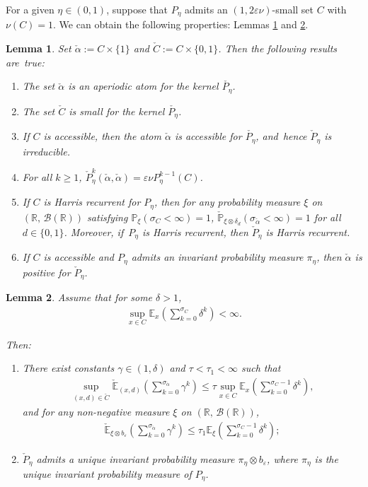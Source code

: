 \documentclass[11pt]{elsarticle}
\newtheorem{lemma}{Lemma}[section]
\def\geq{\geqslant}
\def\leq{\leqslant}
\def\P{\mathbb{P}}
\def\E{\mathbb{E}}
\def\R{\mathbb{R}}
\begin{document}
For a given $\eta\in(0,1)$, suppose that $P_\eta$ admits an $(1,2\varepsilon\nu)$-small set $C$ with $\nu(C)=1$. We can obtain the following properties: Lemmas \ref{prop11.1.4} and \ref{prop-yinna}.

\begin{lemma}\label{prop11.1.4}
	Set $\check{\alpha}:=C\times\{1\}$ and $\check{C}:=C\times\{0,1\}$. Then the following results are~true:
	\begin{enumerate}
		\item [(1)] The set $\check{\alpha}$ is an aperiodic atom for the kernel $\check{P_\eta}$.
		\item [(2)] The set $\check{C}$ is small for the kernel $\check{P_\eta}$.
		\item [(3)] If $C$ is accessible, then the atom $\check{\alpha}$ is accessible for $\check{P_\eta}$, and~hence $\check{P}_\eta$ is irreducible.
		\item [(4)] For all $k\geq1$, $\check{P}_\eta^k\left(\check{\alpha},\check{\alpha}\right)=\varepsilon\nu P_\eta^{k-1}(C)$.
		\item [(5)] If $C$ is Harris recurrent for $P_\eta$, then for any probability measure $\xi$ on $(\R,\,\mathcal{B}(\R))$ satisfying $\P_{\xi}(\sigma_C<\infty)=1$, $\check{\P}_{\xi\otimes\delta_d}(\sigma_{\check{\alpha}}<\infty)=1$ for all $d\in\{0,1\}$. Moreover, if~$P_\eta$ is Harris recurrent, then $\check{P}_\eta$ is Harris recurrent.
		\item [(6)] If $C$ is accessible and $P_\eta$ admits an invariant probability measure $\pi_\eta$, then $\check{\alpha}$ is positive for $\check{P}_\eta$.
	\end{enumerate}
\end{lemma}

\begin{lemma}\label{prop-yinna}
	Assume that for some $\delta>1$,
	\begin{align}\label{ine15.1.1}
		\sup_{x\in C}\E_x\left(\sum_{k=0}^{\sigma_C}\delta^k\right)<\infty.
	\end{align}
	
	Then:
	\begin{enumerate}
		\item [(1)] There exist constants $\gamma\in(1,\delta)$ and $\tau<\tau_1<\infty$ such that
		\begin{align}\label{ine15.1.2}
			\sup_{(x,d)\in \check{C}}\check{\E}_{(x,d)}\left(\sum_{k=0}^{\sigma_{\check{\alpha}}}\gamma^k\right)\leq \tau\sup_{x\in C}\E_x\left(\sum_{k=0}^{\sigma_{C}-1}\delta^k\right),
		\end{align}
		and for any non-negative measure $\xi$ on $(\R,\,\mathcal{B}(\R))$,
		\begin{align}\label{ine15.1.3}
			\check{\E}_{\xi\otimes b_\varepsilon}\left(\sum_{k=0}^{\sigma_{\check{\alpha}}}\gamma^k\right)\leq \tau_1\E_{\xi}\left(\sum_{k=0}^{\sigma_{C}-1}\delta^k\right);
		\end{align}
		\item[(2)] $\check{P}_\eta$ admits a unique invariant probability measure $\pi_\eta\otimes b_\varepsilon$, where $\pi_\eta$ is the unique invariant probability measure of $P_\eta$.
	\end{enumerate}
\end{lemma}
\end{document}
